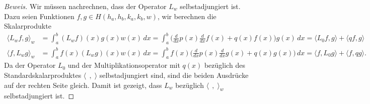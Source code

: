 \begin{proof}[Beweis]
Wir müssen nachrechnen, dass der Operator $L_w$ selbstadjungiert ist.
Dazu seien Funktionen $f,g\in H(h_a,h_b,k_a,k_b,w)$, wir berechnen die
Skalarprodukte
\begin{align*}
\langle L_wf,g\rangle_w
&=
\int_a^b (L_wf)(x)g(x)w(x)\,dx
=
\int_a^b
\biggl(
\frac{d}{dx}p(x)\frac{d}{dx}f(x) + 
q(x) f(x)
\biggr) g(x)\,dx
=
\langle L_0f,g\rangle + \langle qf,g\rangle
\\
\langle f,L_wg\rangle_w
&=
\int_a^b f(x)(L_wg)(x)w(x)\,dx
=
\int_a^b
f(x)
\biggl(
\frac{d}{dx}p(x)\frac{d}{dx}g(x) + 
q(x) g(x)
\biggr) \,dx
=
\langle f,L_0g\rangle + \langle f,qg\rangle.
\end{align*}
Da der Operator $L_0$ und der Multiplikationsoperator mit $q(x)$ bezüglich
des Standardskalarproduktes $\langle\;\,,\;\rangle$ selbstadjungiert sind,
sind die beiden Ausdrücke auf der rechten Seite gleich.
Damit ist gezeigt, dass $L_w$ bezüglich $\langle\;\,,\;\rangle_w$
selbstadjungiert ist.
\end{proof}
